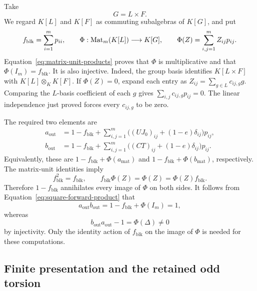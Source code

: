 Take
\begin{equation}
\label{eq:output-group}
G=L\times F.
\end{equation}
We regard $K[L]$ and $K[F]$ as commuting subalgebras of $K[G]$, and put
\begin{equation}
\label{eq:block-embedding}
f_{\mathrm{blk}}=\sum_{i=1}^m p_{ii},
\qquad
\Phi:\operatorname{Mat}_m(K[L])\longrightarrow K[G],
\qquad
\Phi(Z)=\sum_{i,j=1}^m Z_{ij}p_{ij}.
\end{equation}
Equation~\eqref{eq:matrix-unit-products} proves that $\Phi$ is
multiplicative and that $\Phi(I_m)=f_{\mathrm{blk}}$.
It is also injective. Indeed, the group basis identifies
$K[L\times F]$ with $K[L]\otimes_K K[F]$. If $\Phi(Z)=0$, expand
each entry as $Z_{ij}=\sum_{g\in L}c_{ij,g}g$. Comparing the
$L$-basis coefficient of each $g$ gives
$\sum_{i,j}c_{ij,g}p_{ij}=0$. The linear independence just proved
forces every $c_{ij,g}$ to be zero.

The required two elements are
\begin{equation}
\label{eq:output-elements}
\boxed{\begin{aligned}
a_{\mathrm{out}}
 &=1-f_{\mathrm{blk}}+
   \sum_{i,j=1}^m
   \bigl((UJ_0)_{ij}+(1-e)\delta_{ij}\bigr)p_{ij},\\
b_{\mathrm{out}}
 &=1-f_{\mathrm{blk}}+
   \sum_{i,j=1}^m
   \bigl((CT)_{ij}+(1-e)\delta_{ij}\bigr)p_{ij}.
\end{aligned}}
\end{equation}
Equivalently, these are $1-f_{\mathrm{blk}}+\Phi(a_{\mathrm{mat}})$
and $1-f_{\mathrm{blk}}+\Phi(b_{\mathrm{mat}})$, respectively.
The matrix-unit identities imply
\[
f_{\mathrm{blk}}^2=f_{\mathrm{blk}},
\qquad
f_{\mathrm{blk}}\Phi(Z)=\Phi(Z)=\Phi(Z)f_{\mathrm{blk}}.
\]
Therefore $1-f_{\mathrm{blk}}$ annihilates every image of $\Phi$ on
both sides. It follows from Equation~\eqref{eq:square-forward-product}
that
\[
a_{\mathrm{out}}b_{\mathrm{out}}
=1-f_{\mathrm{blk}}+\Phi(I_m)=1,
\]
whereas
\begin{equation}
\label{eq:output-defect}
b_{\mathrm{out}}a_{\mathrm{out}}-1=\Phi(\Delta)\ne0
\end{equation}
by injectivity. Only the identity action of $f_{\mathrm{blk}}$ on the
image of $\Phi$ is needed for these computations.

\subsection{Finite presentation and the retained odd torsion}
\label{sec:finite-presentation}

